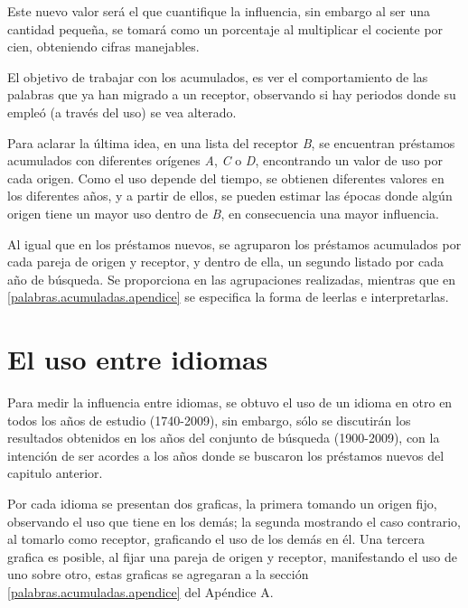 \begin{enumerate}
	Este  nuevo valor será el que cuantifique la influencia, sin embargo al ser una cantidad pequeña, se tomará como un porcentaje al multiplicar el cociente por cien, obteniendo cifras manejables. 
	
	
	
\end{enumerate}

El objetivo de trabajar con los acumulados, es ver el comportamiento de las palabras que ya han migrado a un receptor, observando si hay periodos donde su empleó (a través del uso) se vea alterado. 

Para aclarar la última idea, en una lista del receptor \textit{B}, se encuentran  préstamos acumulados con diferentes orígenes \textit{A}, \textit{C} o \textit{D}, encontrando un valor de uso por cada origen.  Como el uso depende del tiempo, se obtienen diferentes valores en los diferentes años, y a partir de ellos, se pueden estimar las épocas donde algún origen tiene un mayor uso dentro de \textit{B},  en consecuencia una mayor influencia. 

Al igual que en los préstamos nuevos,  se agruparon los préstamos acumulados por cada pareja de origen y receptor,  y dentro de ella, un segundo listado por cada año de búsqueda.  Se proporciona en \cite{prestamos_acumulados} las agrupaciones realizadas, mientras que en \ref{palabras.acumuladas.apendice} se especifica la forma de leerlas e interpretarlas. 



\section {El uso entre idiomas} 

Para medir la influencia entre idiomas, se obtuvo el uso de un idioma en otro en todos los años de estudio (1740-2009), sin embargo, sólo se discutirán los resultados obtenidos en los años del conjunto de búsqueda (1900-2009), con la intención de ser acordes a los años donde se buscaron los préstamos nuevos del capitulo anterior. 

Por cada idioma se presentan dos graficas, la primera tomando un origen fijo, observando el uso que tiene en los demás; la segunda mostrando el caso contrario, al tomarlo como receptor, graficando el uso de los demás en él.  Una tercera grafica es posible, al fijar una pareja de origen y receptor, manifestando el uso de uno sobre otro,  estas graficas se agregaran a la sección \ref{palabras.acumuladas.apendice} del Apéndice A.

